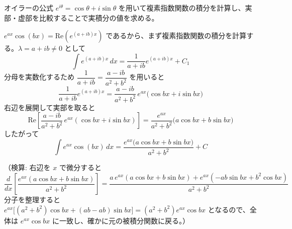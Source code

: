 
オイラーの公式 $e^{i\theta} = \cos\theta + i\sin\theta$ を用いて複素指数関数の積分を計算し、実部・虚部を比較することで実積分の値を求める。

$e^{ax}\cos(bx) = \mathrm{Re}\left(e^{(a+ib)x}\right)$ であるから、まず複素指数関数の積分を計算する。$\lambda = a+ib \neq 0$ として
\[
\int e^{(a+ib)x}\,dx = \frac{1}{a+ib}e^{(a+ib)x} + C_{1}
\]
分母を実数化するため $\dfrac{1}{a+ib} = \dfrac{a-ib}{a^{2}+b^{2}}$ を用いると
\[
\frac{1}{a+ib}e^{(a+ib)x}
= \frac{a-ib}{a^{2}+b^{2}}\,e^{ax}\bigl(\cos bx + i\sin bx\bigr)
\]
右辺を展開して実部を取ると
\[
\mathrm{Re}\left[\frac{a-ib}{a^{2}+b^{2}}\,e^{ax}(\cos bx + i\sin bx)\right]
= \frac{e^{ax}}{a^{2}+b^{2}}\bigl(a\cos bx + b\sin bx\bigr)
\]
したがって
\[
\boxed{\; \int e^{ax}\cos(bx)\,dx = \frac{e^{ax}\bigl(a\cos bx + b\sin bx\bigr)}{a^{2}+b^{2}} + C \;}
\]

（検算: 右辺を $x$ で微分すると
\[
\frac{d}{dx}\left[\frac{e^{ax}(a\cos bx + b\sin bx)}{a^{2}+b^{2}}\right]
= \frac{a\,e^{ax}(a\cos bx + b\sin bx) + e^{ax}(-ab\sin bx + b^{2}\cos bx)}{a^{2}+b^{2}}
\]
分子を整理すると $e^{ax}\bigl[(a^{2}+b^{2})\cos bx + (ab - ab)\sin bx\bigr] = (a^{2}+b^{2})e^{ax}\cos bx$ となるので、全体は $e^{ax}\cos bx$ に一致し、確かに元の被積分関数に戻る。）
